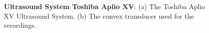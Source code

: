 \begin{figure}
	\centering
		\hspace{0.05\textwidth}

	\caption[Ultrasound System Toshiba Aplio XV]{\textbf{Ultrasound System Toshiba Aplio XV}:
	(a) The Toshiba Aplio XV Ultrasound System. (b) The convex transducer used for the 
	recordings.}
	\label{fig:linguometer:us:intro}
\end{figure}
